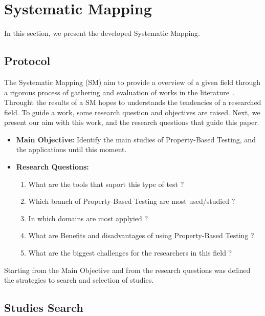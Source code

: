 \section{Systematic Mapping} \label{sec:sys_map}
	
	In this section, we present the developed Systematic Mapping. 

	\subsection{Protocol}

		The Systematic Mapping (SM) aim to provide a overview of a given field through a rigorous process of gathering and evaluation of works in the literature~\cite{petersen2008systematic}. Throught the results of a SM hopes to understands the tendencies of a researched field. To guide a work, some research question and objectives are raised. Next, we present our aim with this work, and the research questions that guide this paper.

		\begin{itemize}
			\item \textbf{Main Objective:} Identify the main studies of Property-Based Testing, and the applications until this moment.
			\item \textbf{Research Questions:}
			\begin{enumerate}
				\item What are the tools that suport this type of test ?
				\item Which branch of Property-Based Testing are most used/studied ?
				\item In which domains are most applyied ?
				\item What are Benefits and disadvantages of using Property-Based Testing ?
				\item What are the biggest challenges for the researchers in this field ?
			\end{enumerate}

		\end{itemize}

		Starting from the Main Objective and from the research questions was defined the strategies to search and selection of studies.

	\subsection{Studies Search}

